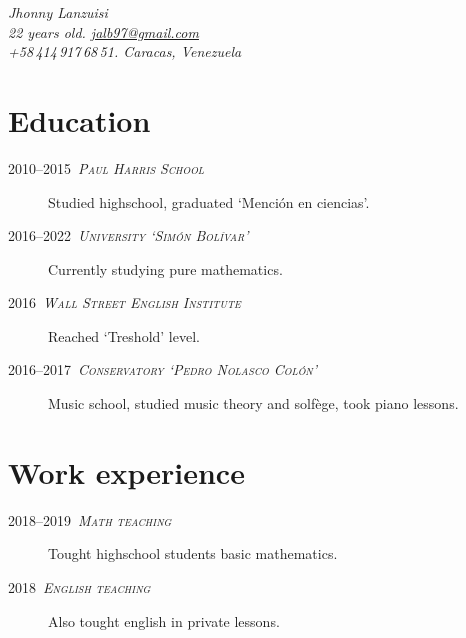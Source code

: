 \documentclass[draft,letterpaper,10pt]{article}
\newcommand{\entryone}[2]{
{\noindent\textsc{#1}}
\begin{quotation}
	\noindent#2.
\end{quotation}
}
\let\oldtextsc=\textsc
\renewcommand{\textsc}[1]{\oldtextsc{\MakeLowercase{#1}}}
\newcommand{\enraya}{–}
\newcommand{\itemtitle}[1]{\,{\itshape\scshape #1}\smallskip}
\begin{document}
\begin{flushright}\Large
	\dispfont\itshape Jhonny Lanzuisi \\ \medskip\normalfont\normalsize
	 22 years old. \url{jalb97@gmail.com} \\ \smallskip
	+58\,414\,917\,68\,51. Caracas, Venezuela 
\end{flushright}
\bigskip

\section*{Education}
\begin{description}
	\item[2010\enraya2015 \itemtitle{Paul Harris School}] Studied highschool, graduated `Mención en ciencias'.
	\item[2016\enraya2022 \itemtitle{University `Simón Bolívar'}] Currently studying pure mathematics.
	\item[2016 \itemtitle{Wall Street English Institute}] Reached `Treshold' level.
	\item[2016\enraya2017 \itemtitle{Conservatory `Pedro Nolasco Colón'}] Music school, studied music theory and solfège, took piano lessons.
\end{description}

\section*{Work experience}
\begin{description}
	\item[2018\enraya2019 \itemtitle{Math teaching}] Tought highschool students basic mathematics.
	\item[2018 \itemtitle{English teaching}] Also tought english in private lessons. 
\end{description}
\end{document}
